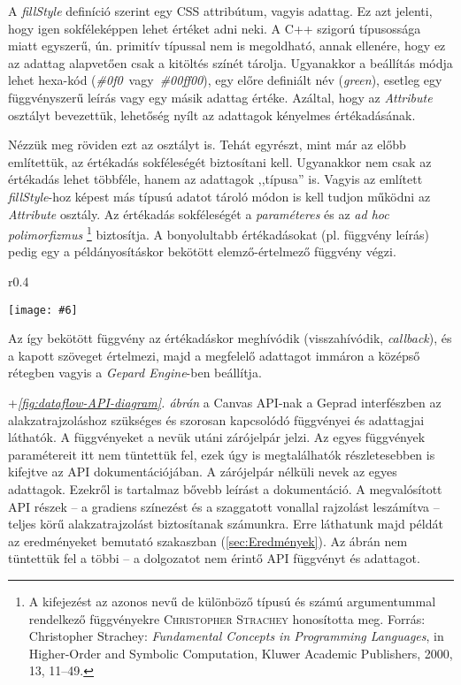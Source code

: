 \documentclass[12pt]{report}
\makeatletter
\theoremstyle{definition}
\newcommand{\inenglish}[1]{\textsl{#1}}
\newcommand{\func}[1]{{\textsl{#1}}}
\newcommand{\melyikoldalra}{r}
\newlength{\Xoffset}
\newlength{\Yoffset}
\newcommand*{\setpdfoffset}[2]{%
  \setlength{\Xoffset}{#1}%
  \setlength{\Yoffset}{#2}%
}
\newcommand*{\setviewport}[4]{%
  \def\x@viewport{%
    {\the\dimexpr#1-\Xoffset}
    {\the\dimexpr#2-\Yoffset}
    {\the\dimexpr#3-\Xoffset}
    {\the\dimexpr#4-\Yoffset}%
  }%
}
\newcommand{\includegraphicskivagas}[6]{
    \setpdfoffset{0pt}{0pt}
    \setviewport{#1}{#2}{#3}{#4}
    \texttt{[image: \#6]}
}
\newcommand{\includedataflowkivagas}[5]{
    \includegraphicskivagas{#1}{#2}{#3}{#4}{scale=0.6,#5}
    {img/built/dataflow_eps}
}
\makeatother
\begin{document}
A \func{fillStyle} definíció szerint egy CSS attribútum, vagyis adattag. Ez azt
jelenti, hogy igen sokféleképpen lehet értéket adni neki. A C++ szigorú
típusossága miatt egyszerű, ún. primitív típussal nem is megoldható, annak
ellenére, hogy ez az adattag alapvetően csak a kitöltés színét tárolja.
Ugyanakkor a beállítás módja lehet hexa-kód
(\func{\#0f0}~vagy~\func{\#00ff00}), egy előre definiált név (\func{green}),
esetleg egy függvényszerű leírás vagy egy másik adattag értéke. Azáltal, hogy
az \func{Attribute} osztályt bevezettük, lehetőség nyílt az adattagok kényelmes
értékadásának.

Nézzük meg röviden ezt az osztályt is. Tehát egyrészt,
mint már az előbb említettük, az értékadás sokféleségét biztosítani
kell. Ugyanakkor nem csak az értékadás lehet többféle, hanem az adattagok
,,típusa'' is. Vagyis az említett \func{fillStyle}-hoz képest más típusú adatot
tároló módon is kell tudjon működni az \func{Attribute} osztály. Az
értékadás sokféleségét a \emph{paraméteres} és az \emph{ad hoc polimorfizmus}
\footnote{A kifejezést az azonos nevű de különböző típusú és számú
argumentummal rendelkező függvényekre \textsc{Christopher Strachey} honosította
meg. Forrás: Christopher Strachey: \emph{Fundamental Concepts in Programming
Languages}, in Higher-Order and Symbolic Computation, Kluwer Academic
Publishers, 2000, 13, 11–49.} biztosítja. A bonyolultabb értékadásokat (pl.
függvény leírás) pedig egy a példányosításkor bekötött elemző-értelmező
függvény végzi.
  \begin{wrapfigure}{\melyikoldalra}{0.4\textwidth}
    \begin{center}
      \includedataflowkivagas{0pt}{210pt}{160pt}{590pt}{}
    \end{center} \caption{\label{fig:dataflow-API-diagram} A \emph{felső} réteg
    (Gepard interfész) függvényei és adattagjai \\ (Részlet
    \az+\emph{\ref{appendix:dataflow}. folyamatábrából}.)}
  \end{wrapfigure}
Az így bekötött függvény az értékadáskor meghívódik (visszahívódik,
\inenglish{callback}), és a kapott szöveget értelmezi, majd a megfelelő
adattagot immáron a középső rétegben vagyis a \func{Gepard Engine}-ben
beállítja.

\Az+\emph{\ref{fig:dataflow-API-diagram}. ábrán} a Canvas API-nak a Geprad
interfészben az alakzatrajzoláshoz szükséges és szorosan kapcsolódó függvényei
és adattagjai láthatók. A függvényeket a nevük utáni zárójelpár jelzi. Az egyes
függvények paramétereit itt nem tüntettük fel, ezek úgy is megtalálhatók
részletesebben is kifejtve az API dokumentációjában. A zárójelpár nélküli nevek
az egyes adattagok. Ezekről is tartalmaz bővebb leírást a dokumentáció. A
megvalósított API részek -- a gradiens színezést és a szaggatott vonallal
rajzolást leszámítva -- teljes körű alakzatrajzolást biztosítanak számunkra.
Erre láthatunk majd példát az eredményeket bemutató szakaszban
(\ref{sec:Eredmények}). Az ábrán nem tüntettük fel a többi -- a dolgozatot nem
érintő API függvényt és adattagot.
\end{document}
